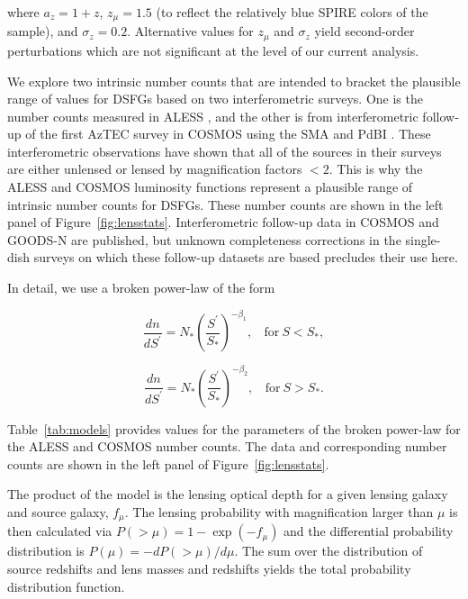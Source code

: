 \documentclass[iop]{emulateapj}
\begin{document}
\noindent where $a_z = 1 + z$, $z_\mu = 1.5$ (to reflect the relatively blue
SPIRE colors of the sample), and $\sigma_z = 0.2$.  Alternative
values for $z_\mu$ and $\sigma_z$ yield second-order perturbations which are
not significant at the level of our current analysis.

We explore two intrinsic number counts that are intended to bracket the
plausible range of values for DSFGs based on two interferometric surveys.  One
is the number counts measured in ALESS \citep{Karim:2013lr}, and the
other is from interferometric follow-up of the first AzTEC survey in COSMOS
\citep{Scott:2008qy} using the SMA \citep{Younger:2007fk, Younger:2009lr} and
PdBI \citep{Miettinen:2015lr}.  These interferometric observations have shown
that all of the sources in their surveys are either unlensed or lensed by
magnification factors $<2$.  This is why the ALESS and COSMOS luminosity
functions represent a plausible range of intrinsic number counts for
DSFGs.  These number counts are shown in the left panel of
Figure~\ref{fig:lensstats}.  Interferometric follow-up data in COSMOS
\citep{Smolcic:2012zl} and GOODS-N \citep{Barger:2012yg} are published, but
unknown completeness corrections in the single-dish surveys on which these
follow-up datasets are based precludes their use here.

In detail, we use a broken power-law of the form

\begin{equation}
\frac{dn}{dS^\prime} = N_\ast\left(\frac{S^\prime}{S_\ast}\right)^{-\beta_1},~~~~\textrm{for}~S<S_\ast,
\end{equation} 

\begin{displaymath}
\frac{dn}{dS^\prime} = N_\ast\left(\frac{S^\prime}{S_\ast}\right)^{-\beta_2},~~~~\textrm{for}~S>S_\ast.
\end{displaymath}

Table~\ref{tab:models} provides values for the parameters of the broken
power-law for the ALESS and COSMOS number counts.  The data and
corresponding number counts are shown in the left panel of
Figure~\ref{fig:lensstats}.

The product of the model is the lensing optical depth for a given lensing
galaxy and source galaxy,  $f_\mu$. The lensing probability with magnification
larger than $\mu$ is then calculated via $P(>\mu) = 1-\exp(-f_\mu)$ and the
differential probability distribution is $P(\mu) = -dP(>\mu)/d\mu$.  The sum
over the distribution of source redshifts and lens masses and redshifts yields
the total probability distribution function.
\end{document}
